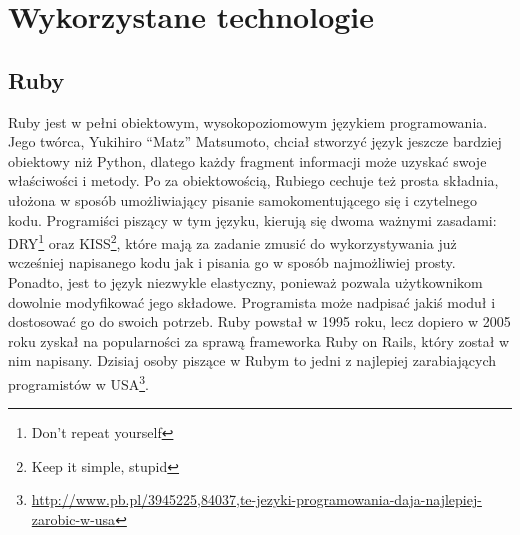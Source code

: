 \section{Wykorzystane technologie}
  \subsection{Ruby}
  Ruby jest w pełni obiektowym, wysokopoziomowym językiem programowania. Jego twórca, Yukihiro “Matz” Matsumoto, chciał stworzyć język jeszcze bardziej obiektowy niż Python, dlatego każdy fragment informacji może uzyskać swoje właściwości i metody. Po za obiektowością, Rubiego cechuje też prosta składnia, ułożona w sposób umożliwiający pisanie samokomentującego się i czytelnego kodu. Programiści piszący w tym języku, kierują się dwoma ważnymi zasadami: DRY\footnote{Don't repeat yourself} oraz KISS\footnote{Keep it simple, stupid}, które mają za zadanie zmusić do wykorzystywania już wcześniej napisanego kodu jak i pisania go w sposób najmożliwiej prosty. Ponadto, jest to język niezwykle elastyczny, ponieważ pozwala użytkownikom dowolnie modyfikować jego składowe. Programista może nadpisać jakiś moduł i dostosować go do swoich potrzeb. Ruby powstał w 1995 roku, lecz dopiero w 2005 roku zyskał na popularności za sprawą frameworka Ruby on Rails, który został w nim napisany. Dzisiaj osoby piszące w Rubym to jedni z najlepiej zarabiających programistów w USA\footnote{\url{http://www.pb.pl/3945225,84037,te-jezyki-programowania-daja-najlepiej-zarobic-w-usa}}.

